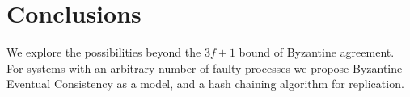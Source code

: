\documentclass[manuscript,anonymous]{acmart}
\begin{document}









\section{Conclusions}

We explore the possibilities beyond the $3f+1$ bound of Byzantine agreement.
For systems with an arbitrary number of faulty processes we propose Byzantine Eventual Consistency as a model, and a hash chaining algorithm for replication.

\end{document}
